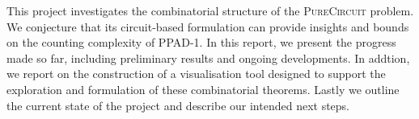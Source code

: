 This project investigates the combinatorial structure of the \textsc{PureCircuit} problem.
We conjecture that its circuit-based formulation can provide insights and bounds on the counting complexity of \textsc{PPAD-1}.
In this report, we present the progress made so far, including preliminary results and ongoing developments.
In addtion, we report on the construction of a visualisation tool designed to support the exploration and formulation of these combinatorial theorems.
Lastly we outline the current state of the project and describe our intended next steps.
